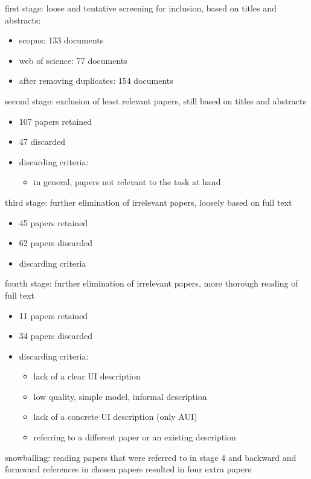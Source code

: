 first stage: loose and tentative screening for inclusion, based on titles and abstracts:
\begin{itemize}
    \item scopus: 133 documents
    \item web of science: 77 documents
    \item after removing duplicates: 154 documents
\end{itemize}

second stage: exclusion of least relevant papers, still based on titles and abstracts
\begin{itemize}
    \item 107 papers retained
    \item 47 discarded
    \item {}discarding criteria:
    \begin{itemize}
        \item in general, papers not relevant to the task at hand
    \end{itemize}
\end{itemize}

third stage: further elimination of irrelevant papers, loosely based on full text
\begin{itemize}
    \item 45 papers retained
    \item 62 papers discarded
    \item {}discarding criteria

\end{itemize}

fourth stage: further elimination of irrelevant papers, more thorough reading of full text
\begin{itemize}
    \item 11 papers retained
    \item 34 papers discarded
    \item {}discarding criteria:
    \begin{itemize}
        \item lack of a clear UI description
        \item low quality, simple model, informal description
        \item lack of a concrete UI description (only AUI)
        \item referring to a different paper or an existing description
    \end{itemize}
\end{itemize}

snowballing: reading papers that were referred to in stage 4 and backward and formward references in chosen papers
resulted in four extra papers
